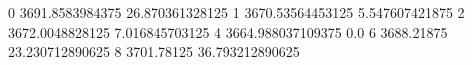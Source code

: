 0 3691.8583984375 26.870361328125
1 3670.53564453125 5.547607421875
2 3672.0048828125 7.016845703125
4 3664.988037109375 0.0
6 3688.21875 23.230712890625
8 3701.78125 36.793212890625

